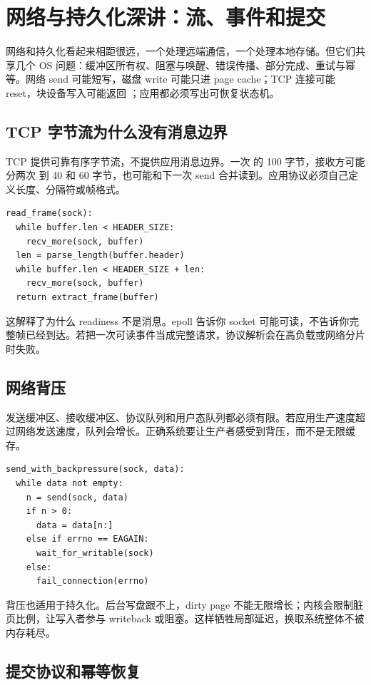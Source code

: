 \section{网络与持久化深讲：流、事件和提交}

网络和持久化看起来相距很远，一个处理远端通信，一个处理本地存储。但它们共享几个 OS 问题：缓冲区所有权、阻塞与唤醒、错误传播、部分完成、重试与幂等。网络 send 可能短写，磁盘 write 可能只进 page cache；TCP 连接可能 reset，块设备写入可能返回 ；应用都必须写出可恢复状态机。

\subsection{TCP 字节流为什么没有消息边界}

TCP 提供可靠有序字节流，不提供应用消息边界。一次  的 100 字节，接收方可能分两次  到 40 和 60 字节，也可能和下一次 send 合并读到。应用协议必须自己定义长度、分隔符或帧格式。

\begin{lstlisting}
read_frame(sock):
  while buffer.len < HEADER_SIZE:
    recv_more(sock, buffer)
  len = parse_length(buffer.header)
  while buffer.len < HEADER_SIZE + len:
    recv_more(sock, buffer)
  return extract_frame(buffer)
\end{lstlisting}

这解释了为什么 readiness 不是消息。epoll 告诉你 socket 可能可读，不告诉你完整帧已经到达。若把一次可读事件当成完整请求，协议解析会在高负载或网络分片时失败。

\subsection{网络背压}

发送缓冲区、接收缓冲区、协议队列和用户态队列都必须有限。若应用生产速度超过网络发送速度，队列会增长。正确系统要让生产者感受到背压，而不是无限缓存。

\begin{lstlisting}
send_with_backpressure(sock, data):
  while data not empty:
    n = send(sock, data)
    if n > 0:
      data = data[n:]
    else if errno == EAGAIN:
      wait_for_writable(sock)
    else:
      fail_connection(errno)
\end{lstlisting}

背压也适用于持久化。后台写盘跟不上，dirty page 不能无限增长；内核会限制脏页比例，让写入者参与 writeback 或阻塞。这样牺牲局部延迟，换取系统整体不被内存耗尽。

\subsection{提交协议和幂等恢复}

